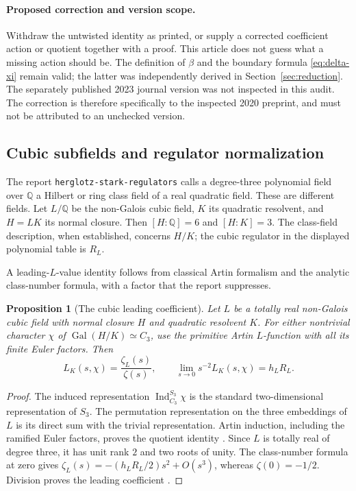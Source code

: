 \documentclass[11pt]{article}
\numberwithin{equation}{section}
\newtheorem{proposition}[theorem]{Proposition}
\theoremstyle{definition}
\theoremstyle{remark}
\newcommand{\Q}{\mathbb Q}
\DeclareMathOperator{\Gal}{Gal}
\begin{document}
\paragraph{Proposed correction and version scope.}
Withdraw the untwisted identity as printed, or supply a corrected
coefficient action or quotient together with a proof. This article
does not guess what a missing action should be. The definition of
$\beta$ and the boundary formula \eqref{eq:delta-xi} remain valid;
the latter was independently derived in Section~\ref{sec:reduction}.
The separately published 2023 journal version was not inspected in
this audit. The correction is therefore specifically to the inspected
2020 preprint, and must not be attributed to an unchecked version.

\subsection{Cubic subfields and regulator normalization}
\label{sec:Stark-correction}

The report \texttt{herglotz-stark-regulators} calls a degree-three
polynomial field over $\Q$ a Hilbert or ring class field of a real
quadratic field. These are different fields. Let $L/\Q$ be the
non-Galois cubic field, $K$ its quadratic resolvent, and $H=LK$
its normal closure. Then $[H:\Q]=6$ and $[H:K]=3$. The class-field
description, when established, concerns $H/K$; the cubic regulator
in the displayed polynomial table is $R_L$.

A leading-$L$-value identity follows from classical Artin formalism
and the analytic class-number formula, with a factor that the report
suppresses.

\begin{proposition}[The cubic leading coefficient]
\label{prop:cubic-L}
Let $L$ be a totally real non-Galois cubic field with normal closure
$H$ and quadratic resolvent $K$. For either nontrivial character
$\chi$ of $\Gal(H/K)\simeq C_3$, use the primitive Artin
$L$-function with all its finite Euler factors. Then
\begin{equation}\label{eq:cubic-L}
 L_K(s,\chi)=\frac{\zeta_L(s)}{\zeta(s)},\qquad
 \lim_{s\to0}s^{-2}L_K(s,\chi)=h_LR_L.
\end{equation}
\end{proposition}
\begin{proof}
The induced representation
$\operatorname{Ind}_{C_3}^{S_3}\chi$ is the standard
two-dimensional representation of $S_3$. The permutation
representation on the three embeddings of $L$ is its direct sum
with the trivial representation. Artin induction, including the
ramified Euler factors, proves the quotient identity
\cite{Cogdell}. Since $L$ is totally real of degree three, it has
unit rank $2$ and two roots of unity. The class-number formula at
zero gives
$\zeta_L(s)=-(h_LR_L/2)s^2+O(s^3)$, whereas $\zeta(0)=-1/2$.
Division proves the leading coefficient \cite[Theorem~3.1.2]{Dasgupta}.
\end{proof}
\end{document}
